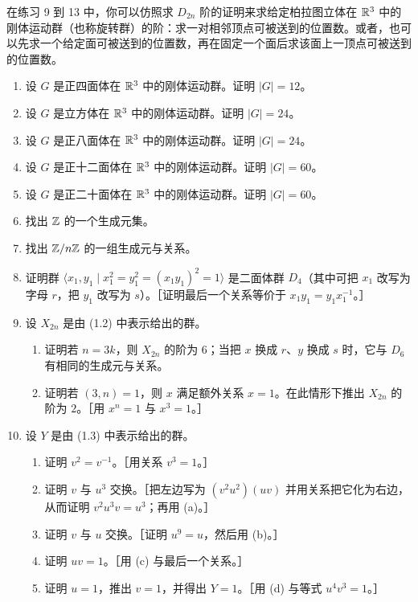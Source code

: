 在练习 9 到 13 中，你可以仿照求 $D_{2n}$ 阶的证明来求给定柏拉图立体在 $\mathbb{R}^3$ 中的刚体运动群（也称旋转群）的阶：求一对相邻顶点可被送到的位置数。或者，也可以先求一个给定面可被送到的位置数，再在固定一个面后求该面上一顶点可被送到的位置数。
\begin{enumerate}[label=\arabic*.,resume]
  \item 设 $G$ 是正四面体在 $\mathbb{R}^3$ 中的刚体运动群。证明 $|G|=12$。
  \item 设 $G$ 是立方体在 $\mathbb{R}^3$ 中的刚体运动群。证明 $|G|=24$。
  \item 设 $G$ 是正八面体在 $\mathbb{R}^3$ 中的刚体运动群。证明 $|G|=24$。
  \item 设 $G$ 是正十二面体在 $\mathbb{R}^3$ 中的刚体运动群。证明 $|G|=60$。
  \item 设 $G$ 是正二十面体在 $\mathbb{R}^3$ 中的刚体运动群。证明 $|G|=60$。
  \item 找出 $\mathbb{Z}$ 的一个生成元集。
  \item 找出 $\mathbb{Z}/n\mathbb{Z}$ 的一组生成元与关系。
  \item 证明群 $\langle x_1,y_1\mid x_1^2=y_1^2=(x_1y_1)^2=1\rangle$ 是二面体群 $D_4$（其中可把 $x_1$ 改写为字母 $r$，把 $y_1$ 改写为 $s$）。［证明最后一个关系等价于 $x_1y_1=y_1x_1^{-1}$。］
  \item 设 $X_{2n}$ 是由 (1.2) 中表示给出的群。
  \begin{enumerate}[label=(\alph*)]
    \item 证明若 $n=3k$，则 $X_{2n}$ 的阶为 $6$；当把 $x$ 换成 $r$、$y$ 换成 $s$ 时，它与 $D_6$ 有相同的生成元与关系。
    \item 证明若 $(3,n)=1$，则 $x$ 满足额外关系 $x=1$。在此情形下推出 $X_{2n}$ 的阶为 $2$。［用 $x^n=1$ 与 $x^3=1$。］
  \end{enumerate}
  \item 设 $Y$ 是由 (1.3) 中表示给出的群。
  \begin{enumerate}[label=(\alph*)]
    \item 证明 $v^2=v^{-1}$。［用关系 $v^3=1$。］
    \item 证明 $v$ 与 $u^3$ 交换。［把左边写为 $(v^2u^2)(uv)$ 并用关系把它化为右边，从而证明 $v^2u^3v=u^3$；再用 (a)。］
    \item 证明 $v$ 与 $u$ 交换。［证明 $u^9=u$，然后用 (b)。］
    \item 证明 $uv=1$。［用 (c) 与最后一个关系。］
    \item 证明 $u=1$，推出 $v=1$，并得出 $Y=1$。［用 (d) 与等式 $u^4v^3=1$。］
  \end{enumerate}
\end{enumerate}


